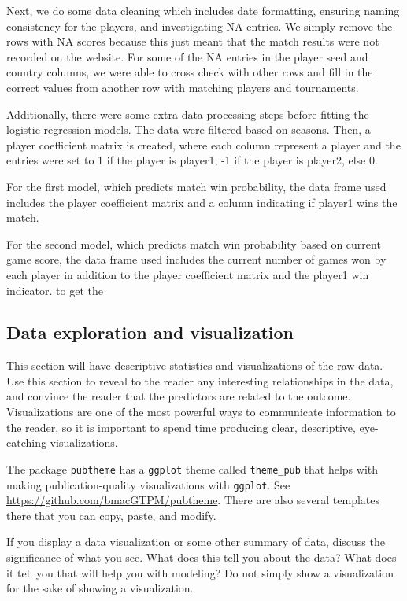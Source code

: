 \documentclass[
]{article}
\begin{document}
Next, we do some data cleaning which includes date formatting, ensuring
naming consistency for the players, and investigating NA entries. We
simply remove the rows with NA scores because this just meant that the
match results were not recorded on the website. For some of the NA
entries in the player seed and country columns, we were able to cross
check with other rows and fill in the correct values from another row
with matching players and tournaments.

Additionally, there were some extra data processing steps before fitting
the logistic regression models. The data were filtered based on seasons.
Then, a player coefficient matrix is created, where each column
represent a player and the entries were set to 1 if the player is
player1, -1 if the player is player2, else 0.

For the first model, which predicts match win probability, the data
frame used includes the player coefficient matrix and a column
indicating if player1 wins the match.

For the second model, which predicts match win probability based on
current game score, the data frame used includes the current number of
games won by each player in addition to the player coefficient matrix
and the player1 win indicator. to get the

\hypertarget{data-exploration-and-visualization}{%
\subsection{Data exploration and
visualization}\label{data-exploration-and-visualization}}

This section will have descriptive statistics and visualizations of the
raw data. Use this section to reveal to the reader any interesting
relationships in the data, and convince the reader that the predictors
are related to the outcome. Visualizations are one of the most powerful
ways to communicate information to the reader, so it is important to
spend time producing clear, descriptive, eye-catching visualizations.

The package \texttt{pubtheme} has a \texttt{ggplot} theme called
\texttt{theme\_pub} that helps with making publication-quality
visualizations with \texttt{ggplot}. See
\url{https://github.com/bmacGTPM/pubtheme}. There are also several
templates there that you can copy, paste, and modify.

If you display a data visualization or some other summary of data,
discuss the significance of what you see. What does this tell you about
the data? What does it tell you that will help you with modeling? Do not
simply show a visualization for the sake of showing a visualization.
\end{document}
